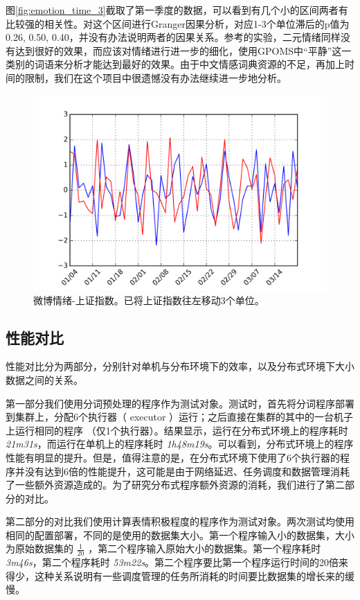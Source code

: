 \documentclass[12pt, oneside]{article}
\begin{document}
\begin{spacing}{1.5}
\begin{CJK}{UTF8}{gbsn}
图\ref{fig:emotion_time_3}截取了第一季度的数据，可以看到有几个小的区间两者有比较强的相关性。对这个区间进行Granger因果分析，对应1-3个单位滞后的p值为0.26, 0.50, 0.40，并没有办法说明两者的因果关系。参考\cite{bollen2011twitter}的实验，二元情绪同样没有达到很好的效果，而应该对情绪进行进一步的细化，使用GPOMS中“平静”这一类别的词语来分析才能达到最好的效果。由于中文情感词典资源的不足\cite{deng2014}，再加上时间的限制，我们在这个项目中很遗憾没有办法继续进一步地分析。

\begin{figure}
	\centering
	\includegraphics[width=0.8\linewidth]{../result/charts/emotion_price_offset3}
	\caption{微博情绪-上证指数。已将上证指数往左移动3个单位。}
	\label{fig:emotion_stock}
\end{figure}

\subsection{性能对比}
性能对比分为两部分，分别针对单机与分布环境下的效率，以及分布式环境下大小数据之间的关系。

第一部分我们使用分词预处理的程序作为测试对象。测试时，首先将分词程序部署到集群上，分配6个执行器（ executor ）运行；之后直接在集群的其中的一台机子上运行相同的程序 （仅1个执行器）。结果显示，运行在分布式环境上的程序耗时 {\it 21m31s}，而运行在单机上的程序耗时 {\it 1h48m19s}。可以看到，分布式环境上的程序性能有明显的提升。但是，值得注意的是，在分布式环境下使用了6个执行器的程序并没有达到6倍的性能提升，这可能是由于网络延迟、任务调度和数据管理消耗了一些额外资源造成的。为了研究分布式程序额外资源的消耗，我们进行了第二部分的对比。

第二部分的对比我们使用计算表情积极程度的程序作为测试对象。两次测试均使用相同的配置部署，不同的是使用的数据集大小。第一个程序输入小的数据集，大小为原始数据集的 $\frac{1}{20}$ ，第二个程序输入原始大小的数据集。第一个程序耗时 {\it 3m46s}，第二个程序耗时 {\it 53m22s}。第二个程序要比第一个程序运行时间的20倍来得少，这种关系说明有一些调度管理的任务所消耗的时间要比数据集的增长来的缓慢。

\newpage
\renewcommand\refname{参考文献}



\end{CJK}
\end{spacing}
\end{document}
